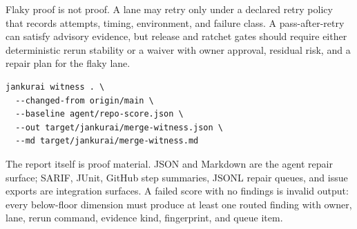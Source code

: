 Flaky proof is not proof. A lane may retry only under a declared retry policy that records attempts, timing, environment, and failure class. A pass-after-retry can satisfy advisory evidence, but release and ratchet gates should require either deterministic rerun stability or a waiver with owner approval, residual risk, and a repair plan for the flaky lane.

\begin{lstlisting}[style=codebox]
jankurai witness . \
  --changed-from origin/main \
  --baseline agent/repo-score.json \
  --out target/jankurai/merge-witness.json \
  --md target/jankurai/merge-witness.md
\end{lstlisting}

The report itself is proof material. JSON and Markdown are the agent repair surface; SARIF, JUnit, GitHub step summaries, JSONL repair queues, and issue exports are integration surfaces. A failed score with no findings is invalid output: every below-floor dimension must produce at least one routed finding with owner, lane, rerun command, evidence kind, fingerprint, and queue item.
